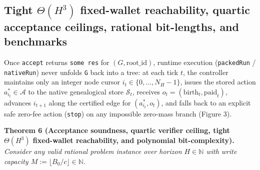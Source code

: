 \documentclass[11pt,a4paper]{article}
\begin{document}
\subsection{\texorpdfstring{Tight \(\Theta(H^3)\) fixed-wallet
reachability, quartic acceptance ceilings, rational bit-lengths, and
benchmarks}{Tight \textbackslash Theta(H\^{}3) fixed-wallet reachability, quartic acceptance ceilings, rational bit-lengths, and benchmarks}}\label{tight-thetah3-fixed-wallet-reachability-quartic-acceptance-ceilings-rational-bit-lengths-and-benchmarks}

Once \texttt{accept} returns \texttt{some\ res} for
\((G, \mathrm{root\_id})\), runtime execution (\texttt{packedRun} /
\texttt{nativeRun}) never unfolds \texttt{G} back into a tree: at each
tick \(t\), the controller maintains only an integer node cursor
\(i_t \in \{0, \dots, N_H - 1\}\), issues the stored action
\(a_{i_t}^* \in \mathcal{A}\) to the native genealogical store
\(\mathcal{S}_t\), receives
\(o_t = (\mathrm{birth}_t, \mathrm{paid}_t)\), advances \(i_{t+1}\)
along the certified edge for \((a_{i_t}^*, o_t)\), and falls back to an
explicit safe zero-fee action (\texttt{stop}) on any impossible
zero-mass branch (Figure 3).

\textbf{Theorem 6 (Acceptance soundness, quartic verifier ceiling, tight
\(\Theta(H^3)\) fixed-wallet reachability, and polynomial
bit-complexity).} \emph{Consider any valid rational problem instance
over horizon \(H \in \mathbb{N}\) with write capacity
\(M := \lfloor B_0 / c \rfloor \in \mathbb{N}\).}
\end{document}
